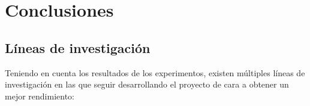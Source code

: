 
\chapter{Conclusiones}
\label{conclusiones}



\section{Líneas de investigación}


	Teniendo en cuenta los resultados de los experimentos, existen múltiples líneas de investigación en las que seguir desarrollando el proyecto de cara a obtener un mejor rendimiento:

